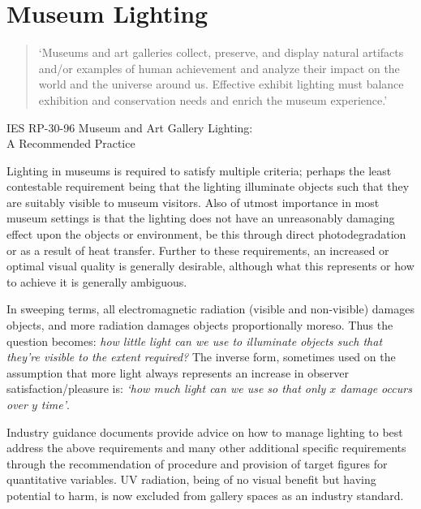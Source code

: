 \section{Museum Lighting}

\bigskip

\begin{quote}
`Museums and art galleries collect, preserve, and display natural artifacts and/or examples of human achievement and analyze their impact on the world and the universe around us. Effective exhibit lighting must balance exhibition and conservation needs and enrich the museum experience.'
\end{quote}

\begin{flushright}IES RP-30-96 Museum and Art Gallery Lighting: \\A Recommended Practice \citep{ies_ies_1996}\end{flushright}

\bigskip

Lighting in museums is required to satisfy multiple criteria; perhaps the least contestable requirement being that the lighting illuminate objects such that they are suitably visible to museum visitors. Also of utmost importance in most museum settings is that the lighting does not have an unreasonably damaging effect upon the objects or environment, be this through direct photodegradation or as a result of heat transfer. Further to these requirements, an increased or optimal visual quality is generally desirable, although what this represents or how to achieve it is generally ambiguous.

In sweeping terms, all electromagnetic radiation (visible and non-visible) damages objects, and more radiation damages objects proportionally moreso. Thus the question becomes: \emph{how little light can we use to illuminate objects such that they're visible to the extent required?} The inverse form, sometimes used on the assumption that more light always represents an increase in observer satisfaction/pleasure is: \emph{`how much light can we use so that only $x$ damage occurs over $y$ time'}. 

Industry guidance documents provide advice on how to manage lighting to best address the above requirements and many other additional specific requirements through the recommendation of procedure and provision of target figures for quantitative variables. \Gls{UV} radiation, being of no visual benefit but having potential to harm, is now excluded from gallery spaces as an industry standard.


